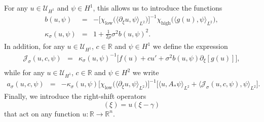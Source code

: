 \documentclass[10pt]{articleHJ}
\newcommand{\Real}{\mathbb{R}}							%
\numberwithin{equation}{section}
\begin{document}
For any $u \in \mathcal{U}_{H^1}$
and $\psi \in H^1$,
this allows us to introduce
the functions
\begin{equation}
\label{eq:mr:def:b:kappa}
\begin{array}{lcl}
b(u, \psi)
 & = &
  - \Big[
    \chi_{\mathrm{low}}\big(
    \langle \partial_\xi u ,
   \psi \rangle_{L^2} \big) \Big]^{-1}
     \chi_{\mathrm{high}}\big(
        \langle g(u) , \psi \rangle_{L^2}
     \big) ,
\\[0.2cm]
%
\kappa_{\sigma}(u, \psi)
& = & 1 + \frac{1}{2\rho} \sigma^2 b( u, \psi )^2.
\end{array}
\end{equation}
In addition, for any
$u \in \mathcal{U}_{H^1}$, $c \in \Real$ and $\psi \in H^1$
we define the expression
\begin{equation}
\label{eq:mr:def:j}
\begin{array}{lcl}
\mathcal{J}_{\sigma}(u , c, \psi)
& = &
  \kappa_{\sigma}(u , \psi)^{-1}
  \Big[
    f(u )
    +c u'
    + \sigma^2 b( u, \psi)
      \partial_\xi [g(u )]
  \Big] ,
\\[0.2cm]
\end{array}
\end{equation}
while for any
$u \in \mathcal{U}_{H^1}$, $c \in \Real$ and $\psi \in H^2$
we write
\begin{equation}
\begin{array}{lcl}
\label{eq:mr:def:a}
%
a_{\sigma}(u,  c, \psi )
 & = & - \kappa_{\sigma}(u,\psi)
    \Big[ \chi_{\mathrm{low}}\big( \langle \partial_\xi u, \psi \rangle_{L^2} \big) \Big]^{-1}
 \Big[
    \langle u , A_* \psi \rangle_{L^2}
    + \langle
       \mathcal{J}_{\sigma}(u , c, \psi ),
     \psi \rangle_{L^2}
 \Big] .
\end{array}
\end{equation}
Finally, we introduce the
right-shift operators
\begin{equation}
[T_{\gamma} u](\xi)
= u(\xi - \gamma)
\end{equation}
that act on any function $u: \Real \to \Real^n$.
\end{document}

